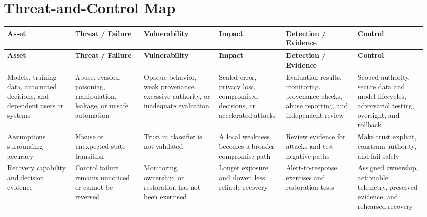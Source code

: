 \documentclass[11pt,letterpaper]{article}
\begin{document}
\section*{Threat-and-Control Map}
\begingroup\scriptsize\setlength{\tabcolsep}{2pt}
\begin{longtable}{>{\raggedright\arraybackslash}p{}>{\raggedright\arraybackslash}p{}>{\raggedright\arraybackslash}p{}>{\raggedright\arraybackslash}p{}>{\raggedright\arraybackslash}p{}>{\raggedright\arraybackslash}p{}}
\toprule\rowcolor{Navy}\color{white}\textbf{Asset} & \color{white}\textbf{Threat / Failure} & \color{white}\textbf{Vulnerability} & \color{white}\textbf{Impact} & \color{white}\textbf{Detection / Evidence} & \color{white}\textbf{Control}\\\midrule
\endfirsthead
\toprule\rowcolor{Navy}\color{white}\textbf{Asset} & \color{white}\textbf{Threat / Failure} & \color{white}\textbf{Vulnerability} & \color{white}\textbf{Impact} & \color{white}\textbf{Detection / Evidence} & \color{white}\textbf{Control}\\\midrule
\endhead
Models, training data, automated decisions, and dependent users or systems & Abuse, evasion, poisoning, manipulation, leakage, or unsafe automation & Opaque behavior, weak provenance, excessive authority, or inadequate evaluation & Scaled error, privacy loss, compromised decisions, or accelerated attacks & Evaluation results, monitoring, provenance checks, abuse reporting, and independent review & Scoped authority, secure data and model lifecycles, adversarial testing, oversight, and rollback\\\midrule
Assumptions surrounding accuracy & Misuse or unexpected state transition & Trust in classifier is not validated & A local weakness becomes a broader compromise path & Review evidence for attacks and test negative paths & Make trust explicit, constrain authority, and fail safely\\\midrule
Recovery capability and decision evidence & Control failure remains unnoticed or cannot be reversed & Monitoring, ownership, or restoration has not been exercised & Longer exposure and slower, less reliable recovery & Alert-to-response exercises and restoration tests & Assigned ownership, actionable telemetry, preserved evidence, and rehearsed recovery\\\midrule
\bottomrule
\end{longtable}
\endgroup
\end{document}
